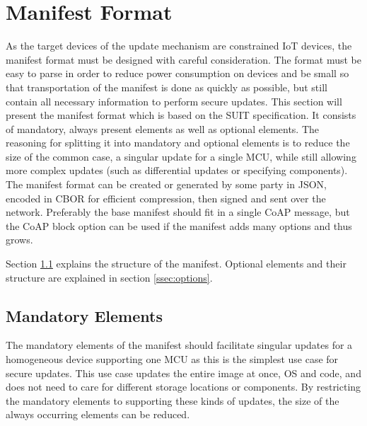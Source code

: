 \documentclass[0-thesis.tex]{subfiles}
\begin{document}

\section{Manifest Format}
\label{sec:manifest-format}
As the target devices of the update mechanism are constrained IoT devices, the manifest
format must be designed with careful consideration. The format must be easy to parse in
order to reduce power consumption on devices and be small so that transportation of the
manifest is done as quickly as possible, but still contain all necessary information to
perform secure updates. This section will present the manifest format which is based on
the SUIT specification. It consists of mandatory, always present elements as well as
optional elements. The reasoning for splitting it into mandatory and optional elements is
to reduce the size of the common case, a singular update for a single MCU, while still
allowing more complex updates (such as differential updates or specifying components). The
manifest format can be created or generated by some party in JSON, encoded in CBOR for
efficient compression, then signed and sent over the network. Preferably the base manifest
should fit in a single CoAP message, but the CoAP block option can be used if the manifest
adds many options and thus grows.

Section \ref{ssec:mandatory-elements} explains the structure of the manifest. Optional
elements and their structure are explained in section \ref{ssec:options}. 

\subsection{Mandatory Elements}
\label{ssec:mandatory-elements}
The mandatory elements of the manifest should facilitate singular updates for a homogeneous
device supporting one MCU as this is the simplest use case for secure updates. This use
case updates the entire image at once, OS and code, and does not need to care for
different storage locations or components. By restricting the mandatory elements to
supporting these kinds of updates, the size of the always occurring elements can be
reduced. 
\end{document}
